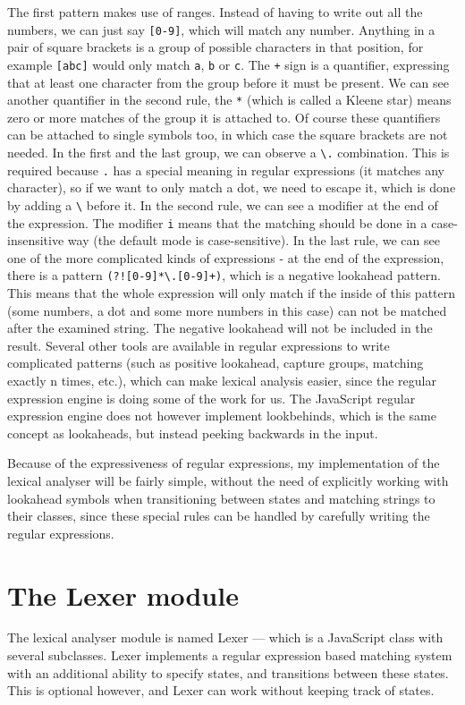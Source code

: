 The first pattern makes use of ranges. Instead of having to write out all the numbers, we can just say \texttt{[0-9]}, which will match any number. Anything in a pair of square brackets is a group of possible characters in that position, for example \texttt{[abc]} would only match \texttt{a}, \texttt{b} or \texttt{c}. The \texttt{+} sign is a quantifier, expressing that at least one character from the group before it must be present. We can see another quantifier in the second rule, the \texttt{*} (which is called a Kleene star) means zero or more matches of the group it is attached to. Of course these quantifiers can be attached to single symbols too, in which case the square brackets are not needed. In the first and the last group, we can observe a \texttt{\textbackslash.} combination. This is required because \texttt{.} has a special meaning in regular expressions (it matches any character), so if we want to only match a dot, we need to escape it, which is done by adding a \texttt{\textbackslash} before it. In the second rule, we can see a modifier at the end of the expression. The modifier \texttt{i} means that the matching should be done in a case-insensitive way (the default mode is case-sensitive). In the last rule, we can see one of the more complicated kinds of expressions - at the end of the expression, there is a pattern \texttt{(?![0-9]*\textbackslash.[0-9]+)}, which is a negative lookahead pattern. This means that the whole expression will only match if the inside of this pattern (some numbers, a dot and some more numbers in this case) can not be matched after the examined string. The negative lookahead will not be included in the result. Several other tools are available in regular expressions to write complicated patterns (such as positive lookahead, capture groups, matching exactly n times, etc.), which can make lexical analysis easier, since the regular expression engine is doing some of the work for us. The JavaScript regular expression engine does not however implement lookbehinds, which is the same concept as lookaheads, but instead peeking backwards in the input.

Because of the expressiveness of regular expressions, my implementation of the lexical analyser will be fairly simple, without the need of explicitly working with lookahead symbols when transitioning between states and matching strings to their classes, since these special rules can be handled by carefully writing the regular expressions.
\section{The Lexer module}
The lexical analyser module is named Lexer --- which is a JavaScript class with several subclasses. Lexer implements a regular expression based matching system with an additional ability to specify states, and transitions between these states. This is optional however, and Lexer can work without keeping track of states.

